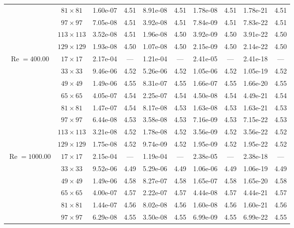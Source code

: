 \documentclass[preprint, 12pt]{elsarticle}
\begin{document}
{\begin{center}
\begin{table}[H]
{\begin{tabular*}{\textwidth}{@{\extracolsep\fill}cccccccccc@{}}
    & $81\times 81$ & 1.60e-07 & 4.51 & 8.91e-08 & 4.51 & 1.78e-08 & 4.51 & 1.78e-21 & 4.51 \\
    & $97\times 97$ & 7.05e-08 & 4.51 & 3.92e-08 & 4.51 & 7.84e-09 & 4.51 & 7.83e-22 & 4.51 \\
    & $113\times 113$ & 3.52e-08 & 4.51 & 1.96e-08 & 4.50 & 3.92e-09 & 4.50 & 3.91e-22 & 4.50 \\
    & $129\times 129$ & 1.93e-08 & 4.50 & 1.07e-08 & 4.50 & 2.15e-09 & 4.50 & 2.14e-22 & 4.50 \\
    \hline
    \multirow{7}{*}{$\operatorname{Re}=400.00$} & $17\times 17$ & 2.17e-04 & --- & 1.21e-04 & --- & 2.41e-05 & --- & 2.41e-18 & --- \\
    & $33\times 33$ & 9.46e-06 & 4.52 & 5.26e-06 & 4.52 & 1.05e-06 & 4.52 & 1.05e-19 & 4.52 \\
    & $49\times 49$ & 1.49e-06 & 4.55 & 8.31e-07 & 4.55 & 1.66e-07 & 4.55 & 1.66e-20 & 4.55 \\
    \multirow{3}{*}{$\operatorname{Wi}=5$} & $65\times 65$ & 4.05e-07 & 4.54 & 2.25e-07 & 4.54 & 4.50e-08 & 4.54 & 4.49e-21 & 4.54 \\
    & $81\times 81$ & 1.47e-07 & 4.54 & 8.17e-08 & 4.53 & 1.63e-08 & 4.53 & 1.63e-21 & 4.53 \\
    & $97\times 97$ & 6.44e-08 & 4.53 & 3.58e-08 & 4.53 & 7.16e-09 & 4.53 & 7.15e-22 & 4.53 \\
    & $113\times 113$ & 3.21e-08 & 4.52 & 1.78e-08 & 4.52 & 3.56e-09 & 4.52 & 3.56e-22 & 4.52 \\
    & $129\times 129$ & 1.75e-08 & 4.52 & 9.74e-09 & 4.52 & 1.95e-09 & 4.52 & 1.95e-22 & 4.52 \\
    \hline
    \multirow{7}{*}{$\operatorname{Re}=1000.00$} & $17\times 17$ & 2.15e-04 & --- & 1.19e-04 & --- & 2.38e-05 & --- & 2.38e-18 & --- \\
    & $33\times 33$ & 9.52e-06 & 4.49 & 5.29e-06 & 4.49 & 1.06e-06 & 4.49 & 1.06e-19 & 4.49 \\
    & $49\times 49$ & 1.49e-06 & 4.58 & 8.27e-07 & 4.58 & 1.65e-07 & 4.58 & 1.65e-20 & 4.58 \\
    \multirow{3}{*}{$\operatorname{Wi}=5$} & $65\times 65$ & 4.00e-07 & 4.57 & 2.22e-07 & 4.57 & 4.44e-08 & 4.57 & 4.44e-21 & 4.57 \\
    & $81\times 81$ & 1.44e-07 & 4.56 & 8.02e-08 & 4.56 & 1.60e-08 & 4.56 & 1.60e-21 & 4.56 \\
    & $97\times 97$ & 6.29e-08 & 4.55 & 3.50e-08 & 4.55 & 6.99e-09 & 4.55 & 6.99e-22 & 4.55 \\

\end{tabular*}}
\end{table}
\end{center}}
\end{document}
